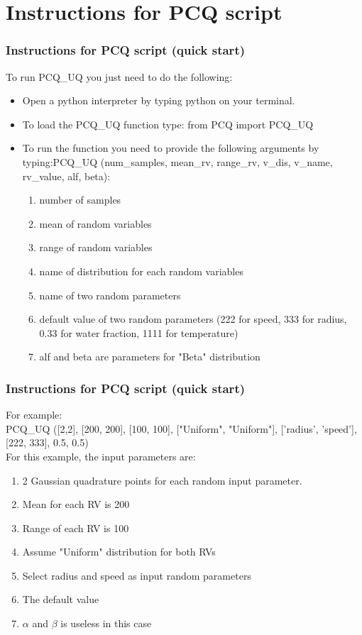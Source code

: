 \documentclass[10pt]{beamer}
\begin{document}
\section{Instructions for PCQ script}
\begin{frame}
\frametitle{Instructions for PCQ script (quick start)}
To run PCQ\_UQ you just need to do the following:
 \begin{itemize}
 
 \item Open a python interpreter by typing python on your terminal.
 
 \item To load the PCQ\_UQ function type: from PCQ import PCQ\_UQ 
 
 \item To run the function you need to provide the following arguments by typing:\newline PCQ\_UQ (num\_samples, mean\_rv, range\_rv, v\_dis, v\_name, rv\_value, alf, beta):
  \begin{enumerate}
 \item number of samples
 \item mean of random variables
 \item range of random variables
 \item name of distribution for each random variables
 \item name of two random parameters
 \item default value of two random parameters (222 for speed, 333 for radius, 0.33 for water fraction, 1111 for temperature)
 \item alf and beta are parameters for "Beta" distribution
 \end{enumerate}

 \end{itemize}

\end{frame}
\begin{frame}
\frametitle{Instructions for PCQ script (quick start)}
For example:\\
  PCQ\_UQ ([2,2], [200, 200], [100, 100], ["Uniform", "Uniform"], ['radius', 'speed'], [222, 333], 0.5, 0.5) \\
 For this example, the input parameters are:
 \begin{enumerate}
 \item 2 Gaussian quadrature points for each random input parameter.
 \item Mean for each RV is 200
 \item Range of each RV is 100
 \item Assume "Uniform" distribution for both RVs
 \item Select radius and speed as input random parameters
 \item The default value
 \item $\alpha$ and $\beta$ is useless in this case
 \end{enumerate}

\end{frame}
\end{document}
